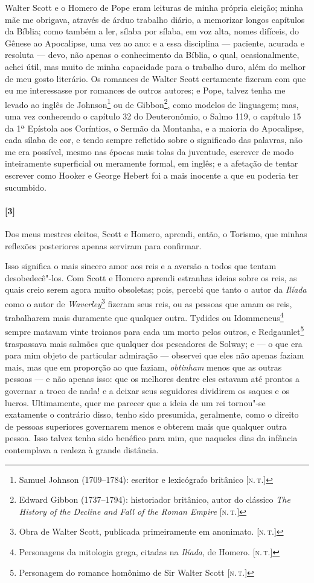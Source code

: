 Walter Scott e o Homero de Pope eram leituras de minha própria eleição;
minha mãe me obrigava, através de árduo trabalho diário, a memorizar
longos capítulos da Bíblia; como também a ler, sílaba por sílaba, em voz
alta, nomes difíceis, do Gênese ao Apocalipse, uma vez ao ano: e a essa
disciplina --- paciente, acurada e resoluta --- devo, não apenas o
conhecimento da Bíblia, o qual, ocasionalmente, achei útil, mas muito de
minha capacidade para o trabalho duro, além do melhor de meu gosto
literário. Os romances de Walter Scott certamente fizeram com que eu me
interessasse por romances de outros autores; e Pope, talvez tenha me
levado ao inglês de Johnson\footnote{Samuel Johnson (1709--1784):
  escritor e lexicógrafo britânico {[}\textsc{n.\,t.}{]}} ou de
Gibbon\footnote{Edward Gibbon (1737--1794): historiador britânico, autor
  do clássico \emph{The History of the Decline and Fall of the Roman
  Empire} {[}\textsc{n.\,t.}{]}}, como modelos de linguagem; mas, uma vez
conhecendo o capítulo 32 do Deuteronômio, o Salmo 119, o capítulo 15 da
1ª Epístola aos Coríntios, o Sermão da Montanha, e a maioria do
Apocalipse, cada sílaba de cor, e tendo sempre refletido sobre o
significado das palavras, não me era possível, mesmo nas épocas mais
tolas da juventude, escrever de modo inteiramente superficial ou
meramente formal, em inglês; e a afetação de tentar escrever como Hooker
e George Hebert foi a mais inocente a que eu poderia ter sucumbido.

\paragraph{[3]} Dos meus mestres eleitos, Scott e Homero, aprendi, então, o Torismo,
que minhas reflexões posteriores apenas serviram para confirmar.

Isso significa o mais sincero amor aos reis e a aversão a todos que
tentam desobedecê"-los. Com Scott e Homero aprendi estranhas ideias sobre
os reis, as quais creio serem agora muito obsoletas; pois, percebi que
tanto o autor da \emph{Ilíada} como o autor de \emph{Waverley}\footnote{Obra
  de Walter Scott, publicada primeiramente em anonimato. {[}\textsc{n.\,t.}{]}}
fizeram seus reis, ou as pessoas que amam os reis, trabalharem mais
duramente que qualquer outra. Tydides ou Idommeneus\footnote{Personagens
  da mitologia grega, citadas na \emph{Ilíada}, de Homero. {[}\textsc{n.\,t.}{]}} sempre matavam vinte troianos para cada um morto pelos outros,
e Redgaunlet\footnote{Personagem do romance homônimo de Sir Walter Scott
  {[}\textsc{n.\,t.}{]}} traspassava mais salmões que qualquer dos pescadores
de Solway; e --- o que era para mim objeto de particular admiração ---
observei que eles não apenas faziam mais, mas que em proporção ao que
faziam, \emph{obtinham} menos que as outras pessoas --- e não apenas
isso: que os melhores dentre eles estavam até prontos a governar a troco
de nada! e a deixar seus seguidores dividirem os saques e os lucros.
Ultimamente, quer me parecer que a ideia de um rei tornou"-se exatamente
o contrário disso, tenho sido presumida, geralmente, como o direito de
pessoas superiores governarem menos e obterem mais que qualquer outra
pessoa. Isso talvez tenha sido benéfico para mim, que naqueles dias da
infância contemplava a realeza à grande distância.


